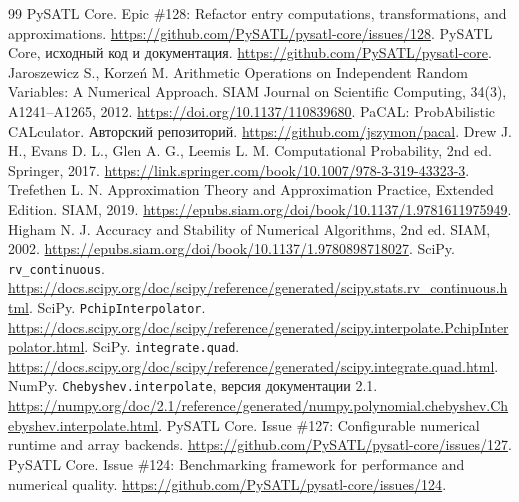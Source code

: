 \documentclass[12pt,a4paper]{article}
\begin{document}
\begin{thebibliography}{99}
 PySATL Core. Epic \#128: Refactor entry computations, transformations, and approximations. \url{https://github.com/PySATL/pysatl-core/issues/128}.
 PySATL Core, исходный код и документация. \url{https://github.com/PySATL/pysatl-core}.
 Jaroszewicz S., Korzeń M. Arithmetic Operations on Independent Random Variables: A Numerical Approach. SIAM Journal on Scientific Computing, 34(3), A1241--A1265, 2012. \url{https://doi.org/10.1137/110839680}.
 PaCAL: ProbAbilistic CALculator. Авторский репозиторий. \url{https://github.com/jszymon/pacal}.
 Drew J. H., Evans D. L., Glen A. G., Leemis L. M. Computational Probability, 2nd ed. Springer, 2017. \url{https://link.springer.com/book/10.1007/978-3-319-43323-3}.
 Trefethen L. N. Approximation Theory and Approximation Practice, Extended Edition. SIAM, 2019. \url{https://epubs.siam.org/doi/book/10.1137/1.9781611975949}.
 Higham N. J. Accuracy and Stability of Numerical Algorithms, 2nd ed. SIAM, 2002. \url{https://epubs.siam.org/doi/book/10.1137/1.9780898718027}.
 SciPy. \texttt{rv\_continuous}. \url{https://docs.scipy.org/doc/scipy/reference/generated/scipy.stats.rv_continuous.html}.
 SciPy. \texttt{PchipInterpolator}. \url{https://docs.scipy.org/doc/scipy/reference/generated/scipy.interpolate.PchipInterpolator.html}.
 SciPy. \texttt{integrate.quad}. \url{https://docs.scipy.org/doc/scipy/reference/generated/scipy.integrate.quad.html}.
 NumPy. \texttt{Chebyshev.interpolate}, версия документации 2.1. \url{https://numpy.org/doc/2.1/reference/generated/numpy.polynomial.chebyshev.Chebyshev.interpolate.html}.
 PySATL Core. Issue \#127: Configurable numerical runtime and array backends. \url{https://github.com/PySATL/pysatl-core/issues/127}.
 PySATL Core. Issue \#124: Benchmarking framework for performance and numerical quality. \url{https://github.com/PySATL/pysatl-core/issues/124}.
\end{thebibliography}
\end{document}
